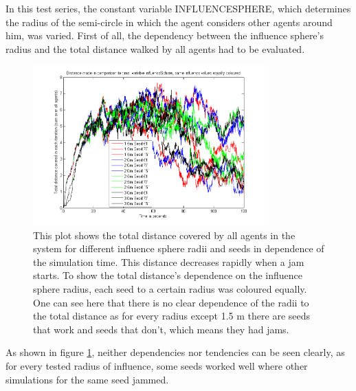 
\noi In this test series, the constant variable INFLUENCESPHERE, which determines the radius of the semi-circle in which the agent considers other agents around him, was varied. First of all, the dependency between the influence sphere's radius and the total distance walked by all agents had to be evaluated.\\

\begin{figure}[h!]
	\centering
		\includegraphics[width=0.80\textwidth]{pictures/ATotalDistanceInfluencesColoured.png}
	\caption{This plot shows the total distance covered by all agents in the system for different influence sphere radii and seeds in dependence of the simulation time. This distance decreases rapidly when a jam starts. To show the total distance's dependence on the influence sphere radius, each seed to a certain radius was coloured equally. One can see here that there is no clear dependence of the radii to the total distance as for every radius except 1.5 m there are seeds that work and seeds that don't, which means they had jams.}
	\label{fig:InfluencesColoured}
\end{figure}

\noi As shown in figure \ref{fig:InfluencesColoured}, neither dependencies nor tendencies can be seen clearly, as for every tested radius of influence, some seeds worked well where other simulations for the same seed jammed.

